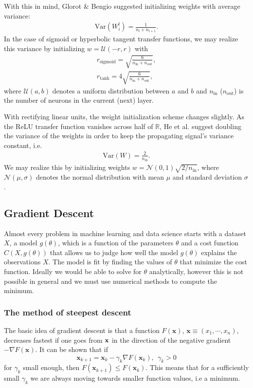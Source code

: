 \documentclass[a4paper, twocolumn]{article}
\begin{document}
With this in mind,  Glorot \& Bengio suggested initializing weights with average variance:\autocite{glorot2010understanding}
\begin{align}
\text{Var}(W_i^l) = \frac{1}{n_l+n_{l+1}}.
\end{align}
In the case of sigmoid or hyperbolic tangent transfer functions, we may realize this variance by initializing $w=\mathcal{U}(-r,r)$ with
\begin{align}
r_\text{sigmoid}=\sqrt{\frac{6}{n_\text{in}+n_\text{out}}}, \nonumber \\
r_\text{tanh}=4\sqrt{\frac{6}{n_\text{in}+n_\text{out}}}, \nonumber
\end{align}
where $\mathcal{U}(a,b)$ denotes a uniform distribution between $a$ and $b$ and $n_\text{in}$ ($n_\text{out}$) is the number of neurons in the current (next) layer.

With rectifying linear units, the weight initialization scheme changes slightly. As the ReLU transfer function vanishes across half of $\mathds{R}$, He et al.\autocite{he2015delving} suggest doubling the variance of the weights in order to keep the propagating signal's variance constant, i.e.\
\begin{align}
\text{Var}(W)=\frac{2}{n_\text{in}}.
\end{align}
We may realize this by initializing weights $w=\mathcal{N}(0,1)\sqrt{2/n_\text{in}}$, where $\mathcal{N}(\mu,\sigma)$ denotes the normal distribution with mean $\mu$ and standard deviation $\sigma$.



\subsection{Gradient Descent \label{sect:gradientdescent}}
Almost every problem in machine learning and data science starts
with a dataset $X$, a model $g(\theta)$, which is a function of the parameters $\theta$ and a cost 
function $C(X, g(\theta))$ that allows us to judge how well the
model $g(\theta)$ explains the observations $X$. The model is fit by finding the values of $\theta$ that minimize the 
cost function. Ideally we would be able to solve for $\theta$ analytically, however this is not possible in general and 
we must use numerical methods to compute the minimum.
\subsubsection{The method of steepest descent}
The basic idea of gradient descent is that a function $F(\mathbf{x})$, $ \mathbf{x} \equiv (x_1,\cdots,x_n)$, 
decreases fastest if one goes from $\bf {x}$ in the direction of the negative gradient $-\nabla F(\mathbf{x})$.
It can be shown that if 
\begin{equation}
\mathbf{x}_{k+1} = \mathbf{x}_k - \gamma_k \nabla F(\mathbf{x}_k), \ \ \gamma_k > 0
\end{equation}
for $\gamma_k$ small enough, then $F(\mathbf{x}_{k+1}) \leq F(\mathbf{x}_k)$. This means that for a sufficiently 
small $\gamma_k$ we are always moving towards smaller function values, i.e a minimum. 
\end{document}
